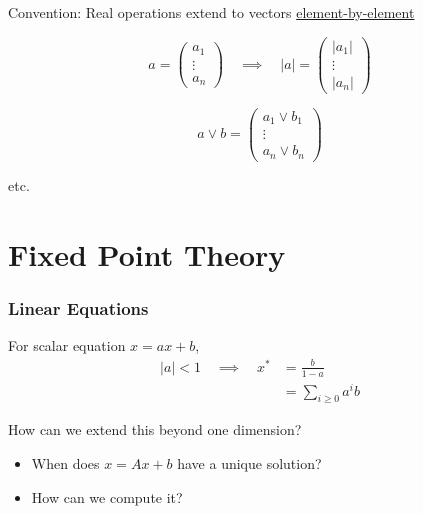 \begin{frame}
    
    Convention: Real operations extend to vectors \underline{element-by-element}

    \vspace{1em}
    \Eg
    \begin{equation*}
        a = 
        \begin{pmatrix}
            a_1 \\
            \vdots \\
            a_n
        \end{pmatrix}
        \quad \implies \quad
        |a| = 
        \begin{pmatrix}
            |a_1| \\
            \vdots \\
            |a_n|
        \end{pmatrix}
    \end{equation*}

    \vspace{1em}

    \begin{equation*}
        a \vee b = 
        \begin{pmatrix}
            a_1 \vee b_1 \\
            \vdots \\
            a_n \vee b_n 
        \end{pmatrix}
    \end{equation*}

    etc.

\end{frame}



\section{Fixed Point Theory}

\begin{frame}
     \frametitle{Linear Equations}   

    For scalar equation $x = ax + b$, 
    \begin{align*}
        |a| < 1 \quad \implies \quad
        x^* & = \frac{b}{1-a} \\
            & = \sum_{i \geq 0} a^i b
    \end{align*}

    How can we extend this beyond one dimension?

    \vspace{1em}
    \begin{itemize}
        \item When does $x = Ax + b$ have a unique solution?
        \vspace{1em}
        \item How can we compute it?
    \end{itemize}

\end{frame}


